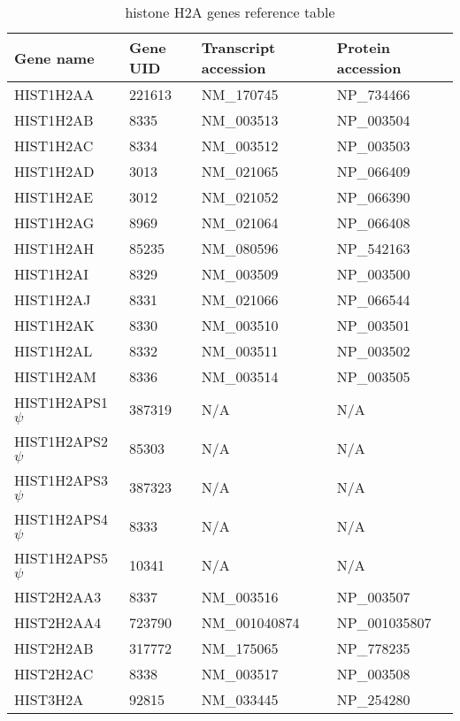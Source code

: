 \documentclass[10pt,a4paper,draft]{article}
\begin{document}
    \begin{table}
      \centering
      \begin{tabular}{l | l | l | l }
        Gene name & Gene UID & Transcript accession & Protein accession \\
        \hline
         HIST1H2AA & 221613 & NM\_170745 & NP\_734466 \\
         HIST1H2AB & 8335 & NM\_003513 & NP\_003504 \\
         HIST1H2AC & 8334 & NM\_003512 & NP\_003503 \\
         HIST1H2AD & 3013 & NM\_021065 & NP\_066409 \\
         HIST1H2AE & 3012 & NM\_021052 & NP\_066390 \\
         HIST1H2AG & 8969 & NM\_021064 & NP\_066408 \\
         HIST1H2AH & 85235 & NM\_080596 & NP\_542163 \\
         HIST1H2AI & 8329 & NM\_003509 & NP\_003500 \\
         HIST1H2AJ & 8331 & NM\_021066 & NP\_066544 \\
         HIST1H2AK & 8330 & NM\_003510 & NP\_003501 \\
         HIST1H2AL & 8332 & NM\_003511 & NP\_003502 \\
         HIST1H2AM & 8336 & NM\_003514 & NP\_003505 \\
         HIST1H2APS1 $\psi$ & 387319 & N/A & N/A \\
         HIST1H2APS2 $\psi$ & 85303 & N/A & N/A \\
         HIST1H2APS3 $\psi$ & 387323 & N/A & N/A \\
         HIST1H2APS4 $\psi$ & 8333 & N/A & N/A \\
         HIST1H2APS5 $\psi$ & 10341 & N/A & N/A \\
         HIST2H2AA3 & 8337 & NM\_003516 & NP\_003507 \\
         HIST2H2AA4 & 723790 & NM\_001040874 & NP\_001035807 \\
         HIST2H2AB & 317772 & NM\_175065 & NP\_778235 \\
         HIST2H2AC & 8338 & NM\_003517 & NP\_003508 \\
         HIST3H2A & 92815 & NM\_033445 & NP\_254280 \\
      \end{tabular}
      \caption{histone H2A genes reference table}
      \label{tab:h2a-ref}
    \end{table}
\end{document}
